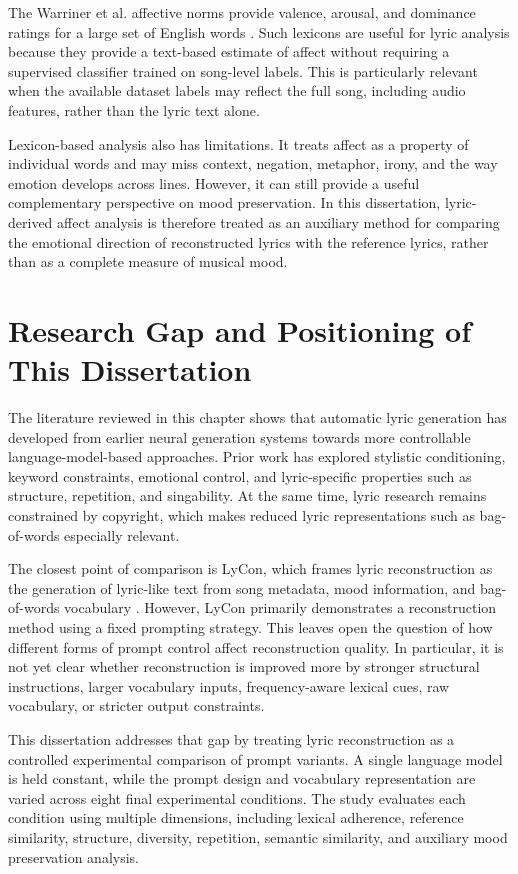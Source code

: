 The Warriner et al. affective norms provide valence, arousal, and dominance ratings for a large set of English words \cite{warriner2013norms}. Such lexicons are useful for lyric analysis because they provide a text-based estimate of affect without requiring a supervised classifier trained on song-level labels. This is particularly relevant when the available dataset labels may reflect the full song, including audio features, rather than the lyric text alone.

Lexicon-based analysis also has limitations. It treats affect as a property of individual words and may miss context, negation, metaphor, irony, and the way emotion develops across lines. However, it can still provide a useful complementary perspective on mood preservation. In this dissertation, lyric-derived affect analysis is therefore treated as an auxiliary method for comparing the emotional direction of reconstructed lyrics with the reference lyrics, rather than as a complete measure of musical mood.

\section{Research Gap and Positioning of This Dissertation}

The literature reviewed in this chapter shows that automatic lyric generation has developed from earlier neural generation systems towards more controllable language-model-based approaches. Prior work has explored stylistic conditioning, keyword constraints, emotional control, and lyric-specific properties such as structure, repetition, and singability. At the same time, lyric research remains constrained by copyright, which makes reduced lyric representations such as bag-of-words especially relevant.

The closest point of comparison is LyCon, which frames lyric reconstruction as the generation of lyric-like text from song metadata, mood information, and bag-of-words vocabulary \cite{kim2024lycon}. However, LyCon primarily demonstrates a reconstruction method using a fixed prompting strategy. This leaves open the question of how different forms of prompt control affect reconstruction quality. In particular, it is not yet clear whether reconstruction is improved more by stronger structural instructions, larger vocabulary inputs, frequency-aware lexical cues, raw vocabulary, or stricter output constraints.

This dissertation addresses that gap by treating lyric reconstruction as a controlled experimental comparison of prompt variants. A single language model is held constant, while the prompt design and vocabulary representation are varied across eight final experimental conditions. The study evaluates each condition using multiple dimensions, including lexical adherence, reference similarity, structure, diversity, repetition, semantic similarity, and auxiliary mood preservation analysis.


